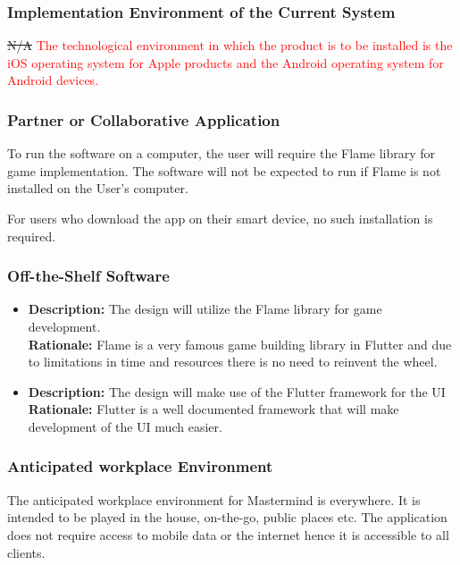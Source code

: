 \documentclass[12pt, titlepage]{article}
\begin{document}
\subsubsection{Implementation Environment of the Current System}
\sout{N/A} \textcolor{red}{The technological environment in which the product is to be installed is the iOS operating system for Apple products and the Android operating system for Android devices.}

\subsubsection{Partner or Collaborative Application}
To run the software on a computer, the user will require the Flame library for game implementation. The software will not be expected to run if Flame is not installed on the User’s computer. 

For users who download the app on their smart device, no such installation is required.
 
\subsubsection{Off-the-Shelf Software}

\begin{itemize}
    \item \textbf{Description:} The design will utilize the Flame library for game development.\\
\textbf{Rationale:} Flame is a very famous game building library in Flutter and due to limitations in time and resources there is no need to reinvent the wheel.
\item \textbf{Description:} The design will make use of the Flutter framework for the UI\\
\textbf{Rationale:} Flutter is a well documented framework that will make development of the UI much easier.
\end{itemize}

\subsubsection{Anticipated workplace Environment}
The anticipated workplace environment for Mastermind is everywhere. It is intended to be played in the house, on-the-go, public places etc. The application does not require access to mobile data or the internet hence it is accessible to all clients.
\end{document}
